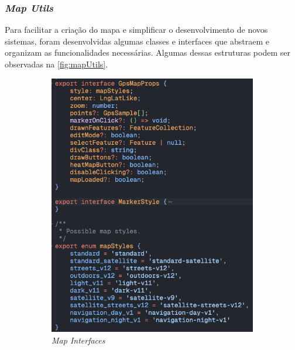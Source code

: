 \subsubsection{\textbf{\textit{Map Utils}}}\label{sec:mapUtils}
Para facilitar a criação do mapa e simplificar o desenvolvimento de novos sistemas, foram desenvolvidas algumas classes e interfaces que abstraem e organizam as funcionalidades necessárias. Algumas dessas estruturas podem ser observadas na \autoref{fig:mapUtils}.

\begin{figure}[!h]
	\centering
	\begin{subfigure}[c]{0.30\textwidth}
		\centering
		\includegraphics[width=\textwidth]{figs/interfaces.png}
		\caption{\textit{Map Interfaces}}
		\label{fig:mapIntefaces}
	\end{subfigure}
	\hfill
	\begin{subfigure}[c]{0.40\textwidth}
		\centering

\end{subfigure}
\end{figure}
